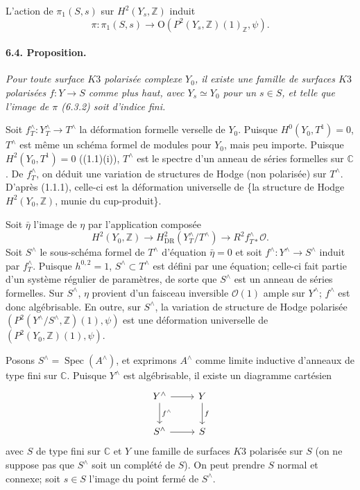 \documentclass[10pt,leqno]{article}
\newcommand{\C}{\mathbb{C}}
\newcommand{\Z}{\mathbb{Z}}
\newcommand{\Spec}{\operatorname{Spec}}
\begin{document}
L'action de $\pi_1(S,s)$ sur $H^2(Y_s,\Z)$ induit
\[
\tag{6.3.2}
\pi:\pi_1(S,s)\longrightarrow \mathrm O(P^2(Y_s,\Z)(1)_\Z,\psi).
\]

\paragraph{6.4. Proposition.} \emph{Pour toute surface $K3$ polarisée complexe $Y_0$, il existe une famille de surfaces $K3$ polarisées $f:Y\to S$ comme plus haut, avec $Y_s\simeq Y_0$ pour un $s\in S$, et telle que l'image de $\pi$ (6.3.2) soit d'indice fini.}

Soit $f_T^\wedge:Y_T^\wedge\to T^\wedge$ la déformation formelle verselle de $Y_0$. Puisque $H^0(Y_0,T^1)=0$, $T^\wedge$ est même un schéma formel de modules pour $Y_0$, mais peu importe. Puisque $H^2(Y_0,T^1)=0$ ((1.1)(i)), $T^\wedge$ est le spectre d'un anneau de séries formelles sur $\C$. De $f_T^\wedge$, on déduit une variation de structures de Hodge (non polarisée) sur $T^\wedge$. D'après (1.1.1), celle-ci est la déformation universelle de \{la structure de Hodge $H^2(Y_0,\Z)$, munie du cup-produit\}.

Soit $\bar\eta$ l'image de $\eta$ par l'application composée
\[
H^2(Y_0,\Z)\longrightarrow H^2_{\mathrm{DR}}(Y_T^\wedge/T^\wedge)
\longrightarrow R^2f_{T*}^\wedge\mathcal O.
\]
Soit $S^\wedge$ le sous-schéma formel de $T^\wedge$ d'équation $\bar\eta=0$ et soit $f^\wedge:Y^\wedge\to S^\wedge$ induit par $f_T^\wedge$. Puisque $h^{0,2}=1$, $S^\wedge\subset T^\wedge$ est défini par une équation; celle-ci fait partie d'un système régulier de paramètres, de sorte que $S^\wedge$ est un anneau de séries formelles. Sur $S^\wedge$, $\eta$ provient d'un faisceau inversible $\mathcal O(1)$ ample sur $Y^\wedge$; $f^\wedge$ est donc algébrisable. En outre, sur $S^\wedge$, la variation de structure de Hodge polarisée $(P^2(Y^\wedge/S^\wedge,\Z)(1),\psi)$ est une déformation universelle de $(P^2(Y_0,\Z)(1),\psi)$.

Posons $S^\wedge=\Spec(A^\wedge)$, et exprimons $A^\wedge$ comme limite inductive d'anneaux de type fini sur $\C$. Puisque $Y^\wedge$ est algébrisable, il existe un diagramme cartésien
\[
\begin{tikzcd}[column sep=2.4em,row sep=2.2em]
Y^\wedge \arrow[r] \arrow[d,"f^\wedge"] & Y \arrow[d,"f"]\\
S^\wedge \arrow[r] & S
\end{tikzcd}
\]
avec $S$ de type fini sur $\C$ et $Y$ une famille de surfaces $K3$ polarisée sur $S$ (on ne suppose pas que $S^\wedge$ soit un complété de $S$). On peut prendre $S$ normal et connexe; soit $s\in S$ l'image du point fermé de $S^\wedge$.
\end{document}
